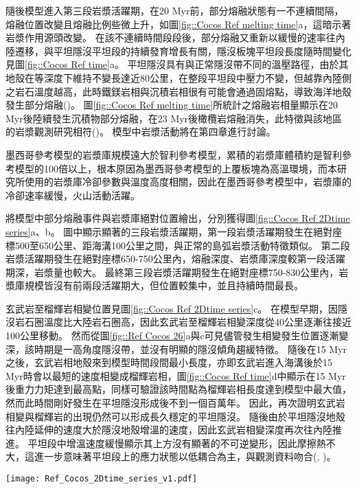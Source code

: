 隨後模型進入第三段岩漿活躍期，在20 Myr前，部分熔融狀態有一不連續間隔，熔融位置改變且熔融比例些微上升，如圖\ref{fig::Cocos Ref melting time}a，這暗示著岩漿作用源頭改變。
在該不連續時間段段後，部分熔融又重新以緩慢的速率往內陸遷移，與平坦隱沒平坦段的持續發育增長有關，隱沒板塊平坦段長度隨時間變化見圖\ref{fig::Cocos Ref time}a。
平坦隱沒具有與正常隱沒帶不同的溫壓路徑，由於其地殼在等深度下維持不變長達近80公里，在整段平坦段中壓力不變，但越靠內陸側之岩石溫度越高，此時鐵鎂岩相與沉積岩相很有可能會通過固熔點，導致海洋地殼發生部分熔融(\citealp{Gutscher2000Bcan})。
圖\ref{fig::Cocos Ref melting time}所統計之熔融岩相量顯示在20 Myr後陸續發生沉積物部分熔融，在23 Myr後橄欖岩熔融消失，此特徵與該地區的岩漿觀測研究相符(\citealp{ferrari2012dynamic})。
模型中岩漿活動將在第四章進行討論。

墨西哥參考模型的岩漿庫規模遠大於智利參考模型，累積的岩漿庫體積約是智利參考模型的100倍以上，根本原因為墨西哥參考模型的上覆板塊為高溫環境，而本研究所使用的岩漿庫冷卻參數與溫度高度相關，因此在墨西哥參考模型中，岩漿庫的冷卻速率緩慢，火山活動活躍。

將模型中部分熔融事件與岩漿庫絕對位置繪出，分別獲得圖\ref{fig::Cocos Ref 2Dtime series}a、b。
圖中顯示顯著的三段岩漿活躍期，第一段岩漿活躍期發生在絕對座標500至650公里、距海溝100公里之間，與正常的島弧岩漿活動特徵類似。
第二段岩漿活躍期發生在絕對座標650-750公里內，熔融深度、岩漿庫深度較第一段活躍期深，岩漿量也較大。
最終第三段岩漿活躍期發生在絕對座標750-830公里內，岩漿庫規模皆沒有前兩段活躍期大，但位置較集中，並且持續時間最長。

玄武岩至榴輝岩相變位置見圖\ref{fig::Cocos Ref 2Dtime series}c。
在模型早期，因隱沒岩石圈溫度比大陸岩石圈高，因此玄武岩至榴輝岩相變深度從40公里逐漸往接近100公里移動。
然而從圖\ref{fig::Ref Cocos 26}a與c可見儘管發生相變發生位置逐漸變深，該時期是一高角度隱沒帶，並沒有明顯的隱沒傾角趨緩特徵。
隨後在15 Myr之後，玄武岩相地殼來到模型時間段間最小長度，亦即玄武岩進入海溝後於15 Myr時會以最短的速度相變成榴輝岩相，圖\ref{fig::Cocos Ref time}d中顯示在15 Myr後重力力矩達到最高點，同樣可驗證該時間點為榴輝岩相長度達到模型中最大值，然而此時間剛好發生在平坦隱沒形成後不到一個百萬年。
因此，再次證明玄武岩相變與榴輝岩的出現仍然可以形成長久穩定的平坦隱沒。
隨後由於平坦隱沒地殼往內陸延伸的速度大於隱沒地殼增溫的速度，因此玄武岩相變深度再次往內陸推進。
平坦段中增溫速度緩慢顯示其上方沒有顯著的不可逆變形，因此摩擦熱不大，這進一步意味著平坦段上的應力狀態以低耦合為主，與觀測資料吻合(\citealp{moran2007cenozoic}, \citealp{PerezCampos2008})。

\begin{figure*}[ht]
    \centering
    \texttt{[image: Ref\_Cocos\_2Dtime\_series\_v1.pdf]}
    \caption[墨西哥參考模型部分熔融、岩漿庫與玄武岩相變時空關係圖]{墨西哥參考模型部分熔融、岩漿庫與玄武岩相變位置時空關係圖。(a)圓點為墨西哥參考模型不同時間的部分熔融發生位置，線條為每10 Myr的隱沒板塊頂部介面(分別為10 Myr, 20Myr, 30 Myr與40 Myr)，橫軸上方標示出模型於40 Myr的相對海溝距離。(b)圓點為墨西哥參考模型不同時間的岩漿庫發生位置，線條為每10 Myr的隱沒板塊頂部介面(分別為10 Myr, 20Myr, 30 Myr與40 Myr)，橫軸上方標示出模型於40 Myr的相對海溝距離。(c)圓點為墨西哥參考模型不同時間之玄武岩相變位置。}
    \label{fig::Cocos Ref 2Dtime series}
\end{figure*}

